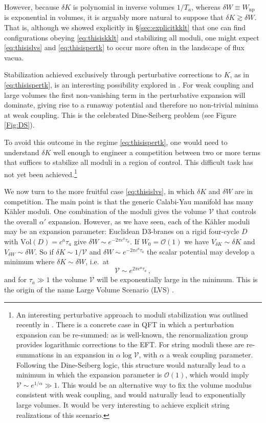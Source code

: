 \documentclass[12pt,a4wide]{article}
\def\O{\mathcal{O}}
\def\V{\mathcal{V}}
\begin{document}
 
However, because $\delta K$ is polynomial in inverse volumes $1/T_a$, whereas $\delta W \equiv W_{\text{np}}$ is exponential in volumes, it is arguably more natural to suppose that $\delta K \gtrsim \delta W$.  That is, although we showed explicitly in \S\ref{sec:explicitkklt} that one can find configurations obeying \eqref{eq:thisiskklt} and stabilizing all moduli, one might expect \eqref{eq:thisislvs} and \eqref{eq:thisispertk} to occur more often in the landscape of flux vacua.

Stabilization achieved exclusively through perturbative corrections to $K$, as in \eqref{eq:thisispertk}, is an interesting possibility explored in \cite{Berg:2005yu}.
For weak coupling and large volumes the first non-vanishing term in the perturbative expansion will dominate, giving rise to a runaway potential and therefore no non-trivial minima at weak coupling. This is the celebrated Dine-Seiberg problem (see Figure \ref{Fig:DS}). 



To avoid this outcome in the regime \eqref{eq:thisispertk}, one would need to understand $\delta K$ well enough to engineer a competition between two or more terms that suffices to stabilize all moduli in a region of control.  This difficult task has not yet been achieved.\footnote{An interesting perturbative approach to moduli stabilization was outlined recently in \cite{Burgess:2022nbx}. There is a concrete case in QFT in which a perturbation expansion can be re-summed: as is well-known, the renormalization group provides logarithmic corrections to the EFT. For string moduli these are re-summations in an expansion in $\alpha \log \V$, with $\alpha$ a weak coupling  parameter.  Following the Dine-Seiberg logic, this structure would naturally lead to a minimum in which the expansion parameter is  $\O(1)$, which would imply $\V\sim e^{1/\alpha}\gg 1$. This would be an alternative way to fix the volume modulus consistent with weak coupling, and would naturally lead to exponentially large volumes. It would be very interesting to achieve explicit string realizations of this scenario.}



We now turn to the more fruitful case \eqref{eq:thisislvs}, in which  $\delta K$ and  $\delta W$ are in competition. 
The main point is that the generic Calabi-Yau manifold has many K\"ahler moduli.  One combination of the moduli  gives the volume $\V$ that controls the overall $\alpha'$ expansion. However, as we have seen, each of the K\"ahler  moduli may be an expansion parameter: Euclidean D3-branes 
on a rigid four-cycle $D$ with $\text{Vol}(D)=c^a \tau_a$ give $\delta W \sim e^{-2\pi c^a\tau_a}$. 
If $W_0=\O(1)$ we have $V_{\delta K}\sim \delta K$ and $V_{\delta W}\sim \delta W$.
So if $\delta K\sim 1/\V $ and $\delta W\sim e^{-2\pi c^a\tau_a}$ the scalar potential may develop a minimum where $\delta K \sim  \delta W$, i.e.~at 
\begin{equation}\label{eq:lvsrel}
    \V\sim e^{2\pi c^a\tau_a}\,,
\end{equation} and for  
$\tau_a \gg 1$ the volume $\V$ will be exponentially large in the minimum.  This is the origin of the name Large Volume Scenario (LVS) \cite{Balasubramanian:2005zx, Conlon:2005jm}.
\end{document}
